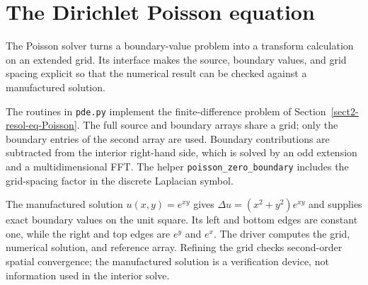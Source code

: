 \begin{listing}[H]
\caption{Reconstruction of an integer from its digits.}
\label{listing-vector2number}
\end{listing}

\begin{listing}[H]
\caption{Verification of a large-integer product.}
\label{listing-test-mult-integers}
\end{listing}

\section{The Dirichlet Poisson equation}
\label{sect1-listing-fish}

The Poisson solver turns a boundary-value problem into a transform
calculation on an extended grid. Its interface makes the source, boundary
values, and grid spacing explicit so that the numerical result can be
checked against a manufactured solution.

The routines in \texttt{pde.py} implement the finite-difference problem
of Section~\ref{sect2-resol-eq-Poisson}. The full source and boundary
arrays share a grid; only the boundary entries of the second array are
used. Boundary contributions are subtracted from the interior right-hand
side, which is solved by an odd extension and a multidimensional FFT.
The helper \texttt{poisson\_zero\_boundary} includes the grid-spacing
factor in the discrete Laplacian symbol.

The manufactured solution $u(x,y)=e^{xy}$ gives
$\Delta u=(x^2+y^2)e^{xy}$ and supplies exact boundary values on the
unit square. Its left and bottom edges are constant one, while the
right and top edges are $e^y$ and $e^x$. The driver computes the grid,
numerical solution, and reference array. Refining the grid checks
second-order spatial convergence; the manufactured solution is a
verification device, not information used in the interior solve.
\begin{listing}[H]
\caption{A Dirichlet Poisson solver and a manufactured-solution example.}
\label{fish-listing}
\end{listing}

\begin{listing}[H]
\caption{The source term for the exact solution $e^{xy}$.}
\label{listing-f}
\end{listing}

